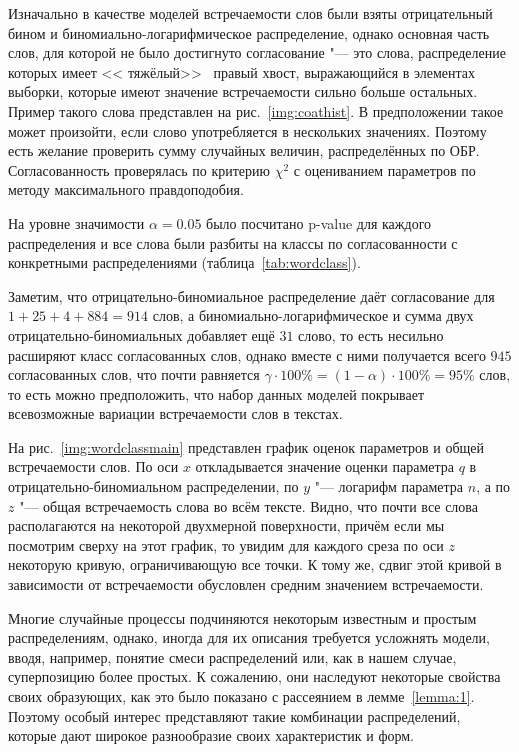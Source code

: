\documentclass[12pt, specialist, subf, substylefile = spbu.rtx]{disser}
\begin{document}
	Изначально в качестве моделей встречаемости слов были взяты отрицательный бином и биномиально-логарифмическое распределение, однако основная часть слов, для которой не было достигнуто согласование "--- это слова, распределение которых имеет << тяжёлый>>~ правый хвост, выражающийся в элементах выборки, которые имеют значение встречаемости сильно больше остальных. Пример такого слова представлен на рис.~\ref{img:coathist}. В предположении такое может произойти, если слово употребляется в нескольких значениях. Поэтому есть желание проверить сумму случайных величин, распределённых по ОБР. Согласованность проверялась по критерию $ \chi ^2 $ с оцениванием параметров по методу максимального правдоподобия.
	
	На уровне значимости $ \alpha = 0.05 $ было посчитано p-value для каждого распределения и все слова были разбиты на классы по согласованности с конкретными распределениями (таблица~\ref{tab:wordclass}).
	
	Заметим, что отрицательно-биномиальное распределение даёт согласование для $1 + 25 + 4 + 884 = 914$ слов, а биномиально-логарифмическое и сумма двух отрицательно-биномиальных добавляет ещё $31$ слово, то есть несильно расширяют класс согласованных слов, однако вместе с ними получается всего $945$ согласованных слов, что почти равняется $\gamma \cdot 100 \% = (1 - \alpha) \cdot 100 \% = 95 \%$ слов, то есть можно предположить, что набор данных моделей покрывает всевозможные вариации встречаемости слов в текстах.
	
	На рис.~\ref{img:wordclassmain} представлен график оценок параметров и общей встречаемости слов. По оси $x$ откладывается значение оценки параметра $q$ в отрицательно-биномиальном распределении, по $y$ "--- логарифм параметра $n$, а по $z$ "--- общая встречаемость слова во всём тексте. Видно, что почти все слова располагаются на некоторой двухмерной поверхности, причём если мы посмотрим сверху на этот график, то увидим для каждого среза по оси $z$ некоторую кривую, ограничивающую все точки. К тому же, сдвиг этой кривой в зависимости от встречаемости обусловлен средним значением встречаемости.
		
	\conclusion
	
	Многие случайные процессы подчиняются некоторым известным и простым распределениям, однако, иногда для их описания требуется усложнять модели, вводя, например, понятие смеси распределений или, как в нашем случае, суперпозицию более простых. К сожалению, они наследуют некоторые свойства своих образующих, как это было показано с рассеянием в лемме~\ref{lemma:1}. Поэтому особый интерес представляют такие комбинации распределений, которые дают широкое разнообразие своих характеристик и форм.
	
\end{document}
